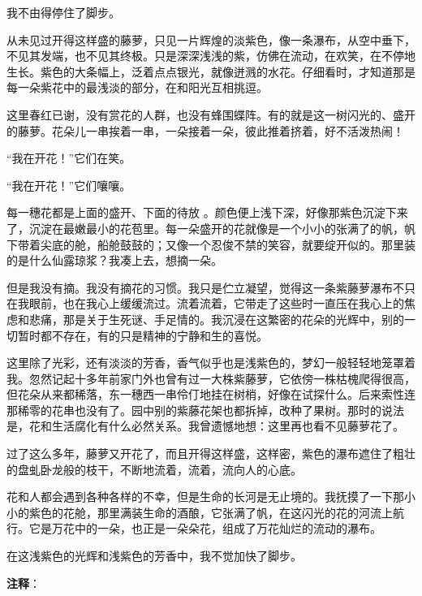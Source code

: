 \documentclass[12pt,UTF-8,openany]{ctexbook}
\begin{document}
\begin{normalsize}
    
    我不由得停住了脚步。
    
    从未见过开得这样盛的藤萝，只见一片辉煌的淡紫色，像一条瀑布，从空中垂下，不见其发端，也不见其终极。只是深深浅浅的紫，仿佛在流动，在欢笑，在不停地生长。紫色的大条幅上，泛着点点银光，就像迸溅的水花。仔细看时，才知道那是每一朵紫花中的最浅淡的部分，在和阳光互相挑逗。
    
    这里春红已谢，没有赏花的人群，也没有蜂围蝶阵。有的就是这一树闪光的、盛开的藤萝。花朵儿一串挨着一串，一朵接着一朵，彼此推着挤着，好不活泼热闹！
    
    “我在开花！”它们在笑。
    
    “我在开花！”它们嚷嚷。
    
    每一穗花都是上面的盛开、下面的待放 。颜色便上浅下深，好像那紫色沉淀下来了，沉淀在最嫩最小的花苞里。每一朵盛开的花就像是一个小小的张满了的帆，帆下带着尖底的舱，船舱鼓鼓的；又像一个忍俊不禁的笑容，就要绽开似的。那里装的是什么仙露琼浆？我凑上去，想摘一朵。
    
    但是我没有摘。我没有摘花的习惯。我只是伫立凝望，觉得这一条紫藤萝瀑布不只在我眼前，也在我心上缓缓流过。流着流着，它带走了这些时一直压在我心上的焦虑和悲痛，那是关于生死谜、手足情的。我沉浸在这繁密的花朵的光辉中，别的一切暂时都不存在，有的只是精神的宁静和生的喜悦。
    
    这里除了光彩，还有淡淡的芳香，香气似乎也是浅紫色的，梦幻一般轻轻地笼罩着我。忽然记起十多年前家门外也曾有过一大株紫藤萝，它依傍一株枯槐爬得很高，但花朵从来都稀落，东一穗西一串伶仃地挂在树梢，好像在试探什么。后来索性连那稀零的花串也没有了。园中别的紫藤花架也都拆掉，改种了果树。那时的说法是，花和生活腐化有什么必然关系。我曾遗憾地想：这里再也看不见藤萝花了。
    
    过了这么多年，藤萝又开花了，而且开得这样盛，这样密，紫色的瀑布遮住了粗壮的盘虬卧龙般的枝干，不断地流着，流着，流向人的心底。
    
    花和人都会遇到各种各样的不幸，但是生命的长河是无止境的。我抚摸了一下那小小的紫色的花舱，那里满装生命的酒酿，它张满了帆，在这闪光的花的河流上航行。它是万花中的一朵，也正是一朵朵花，组成了万花灿烂的流动的瀑布。
    
    在这浅紫色的光辉和浅紫色的芳香中，我不觉加快了脚步。
    
\end{normalsize}


\newpage

\textbf{注释}：

\vspace{-1em}
\end{document}
